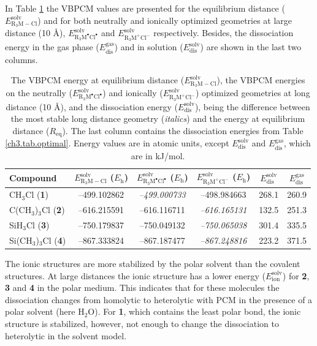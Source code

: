 In Table \ref{ch3.tab.solution} the VBPCM values are presented for the equilibrium distance ($E_\mathrm{R_{3}M-Cl}^\mathrm{solv}$) and for both neutrally and ionically optimized geometries at large distance (10 \AA), $E_\mathrm{R_{3}M^\bullet Cl^\bullet}^\mathrm{solv}$ and $E_\mathrm{R_{3}M^{+} Cl^{-}}^\mathrm{solv}$ respectively. Besides, the dissociation energy in the gas phase ($E_\mathrm{dis}^\mathrm{gas}$) and in solution ($E_\mathrm{dis}^\mathrm{solv}$) are shown in the last two columns.
\begin{table}[htp]
\center
\caption{The VBPCM energy at equilibrium distance ($E_\mathrm{R_{3}M-Cl}^\mathrm{solv}$), the VBPCM energies on the neutrally ($E_\mathrm{R_{3}M^\bullet Cl^\bullet}^\mathrm{solv}$) and ionically ($E_\mathrm{R_{3}M^{+} Cl^{-}}^\mathrm{solv}$) optimized geometries at long distance (10 \AA), and the dissociation energy ($E_\mathrm{dis}^\mathrm{solv}$), being the difference between the most stable long distance geometry (\textit{italics}) and the energy at equilibrium distance ($R_\mathrm{eq}$). The last column contains the dissociation energies from Table \ref{ch3.tab.optimal}. Energy values are in atomic units, except $E_\mathrm{dis}^\mathrm{solv}$ and $E_\mathrm{dis}^\mathrm{gas}$, which are in kJ/mol.}
\begin{tabular}{|l|c|c|c|c|c|}
\hline
\textbf{Compound} & $E_\mathrm{R_{3}M-Cl}^\mathrm{solv}$ ($E_{\mathrm{h}}$) & $E_\mathrm{R_{3}M^\bullet Cl^\bullet}^\mathrm{solv}$ ($E_{\mathrm{h}}$) & $E_\mathrm{R_{3}M^{+} Cl^{-}}^\mathrm{solv}$ ($E_{\mathrm{h}}$) & $E_\mathrm{dis}^\mathrm{solv}$&
$E_\mathrm{dis}^\mathrm{gas}$\\
\hline
CH$_3$Cl (\textbf{1})& --499.102862 & \textit{--499.000733} & --498.984663 & 268.1 & 260.9 \\
C(CH$_3$)$_3$Cl (\textbf{2})& --616.215591 & --616.116711 & \textit{--616.165131} & 132.5 & 251.3 \\
SiH$_3$Cl (\textbf{3})& --750.179837 & --750.049132 & \textit{--750.065038} &  301.4 & 335.5 \\
Si(CH$_3$)$_3$Cl (\textbf{4})& --867.333824 & --867.187477 & \textit{--867.248816} & 223.2 & 371.5 \\
\hline
\end{tabular}
\label{ch3.tab.solution}
\end{table} 

The ionic structures are more stabilized by the polar solvent than the covalent structures. At large distances the ionic structure has a lower energy ($E_\mathrm{ion}^\mathrm{solv}$) for \textbf{2}, \textbf{3} and \textbf{4} in the polar medium. This indicates that for these molecules the dissociation changes from homolytic to heterolytic with PCM in the presence of a polar solvent (here H$_2$O). For \textbf{1}, which contains the least polar bond, the ionic structure is stabilized, however, not enough to change the dissociation to heterolytic in the solvent model.

